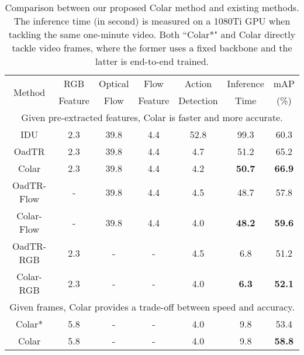 \documentclass[10pt,twocolumn,letterpaper]{article}
\begin{document}
\begin{table}[thbp]
  \centering
  \caption{Comparison between our proposed Colar method and existing methods. The inference time (in second) is measured on a 1080Ti GPU when tackling the same one-minute video. Both ``Colar*" and Colar directly tackle video frames, where the former uses a fixed backbone and the latter is end-to-end trained.}
  \setlength{\tabcolsep}{1.5pt}
  \small
    \begin{tabular}{c|cccc|c|c}
    \toprule
    \toprule
    \multirow{2}[2]{*}{Method} & RGB   & Optical & Flow  & Action & {\footnotesize Inference} & mAP \\
          & Feature & Flow  & Feature & Detection & Time  & (\%) \\
    \midrule
    \midrule
    \multicolumn{7}{c}{\footnotesize Given pre-extracted features, Colar is faster and more accurate.} \\
    \midrule
    IDU\cite{eun2020learning} & 2.3   & 39.8  & 4.4   & 52.8  & 99.3  & 60.3 \\
    OadTR\cite{wang2021oadtr} & 2.3   & 39.8  & 4.4   & 4.7   & 51.2  & 65.2 \\
    Colar & 2.3   & 39.8  & 4.4   & 4.2   & \textbf{50.7} & \textbf{66.9} \\
    \midrule
    OadTR-Flow & -     & 39.8  & 4.4   & 4.5   & 48.7  & 57.8 \\
    Colar-Flow & -     & 39.8  & 4.4   & 4.0   & \textbf{48.2} & \textbf{59.6} \\
    \midrule
    OadTR-RGB & 2.3   & -     & -     & 4.5   & 6.8   & 51.2 \\
    Colar-RGB & 2.3   & -     & -     & 4.0   & \textbf{6.3} & \textbf{52.1} \\
    \midrule
    \midrule
    \multicolumn{7}{c}{\footnotesize Given frames, Colar provides a trade-off between speed and accuracy.} \\
    \midrule
    Colar* & 5.8   & -     & -     & 4.0   & 9.8   & 53.4  \\
    Colar & 5.8   & -     & -     & 4.0   & 9.8   & \textbf{58.8}  \\
    \bottomrule
    \bottomrule
    \end{tabular}\label{tabCmpRunTime}\end{table}
\end{document}

